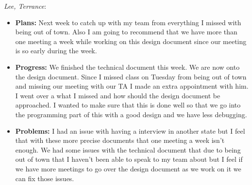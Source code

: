 \documentclass[10pt,draftclsnofoot,onecolumn]{IEEEtran}
\newcommand{\subsubsubsection}[1]{
	\hfill\break\textit{#1}:
}
\begin{document}
\subsubsubsection{Lee, Terrance}
\begin{itemize}
	\item \textbf{Plans: }Next week to catch up with my team from everything I missed with being out of town. Also I am going to recommend that we have more than one meeting a week while working on this design document since our meeting is so early during the week.
	\item \textbf{Progress: }We finished the technical document this week. We are now onto the design document. Since I missed class on Tuesday from being out of town and missing our meeting with our TA I made an extra appointment with him. I went over a what I missed and how should the design document be approached. I wanted to make sure that this is done well so that we go into the programming part of this with a good design and we have less debugging.
	\item \textbf{Problems: }I had an issue with having a interview in another state but I feel that with these more precise documents that one meeting a week isn't enough. We had some issues with the technical document that due to being out of town that I haven't been able to speak to my team about but I feel if we have more meetings to go over the design document as we work on it we can fix those issues.
\end{itemize}
\end{document}

